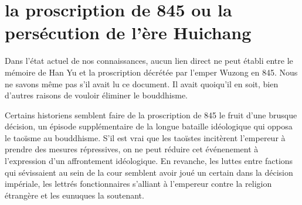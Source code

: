 \section{la proscription de 845 ou la persécution de l'ère Huichang}
\item Dans l'état actuel de nos connaissances, aucun lien direct ne peut établi entre le mémoire de Han Yu et la proscription décrétée par l'emper Wuzong en 845. Nous ne savons même pas s'il avait lu ce document. Il avait quoiqu'il en soit, bien d'autres raisons de vouloir éliminer le bouddhisme.
\item  Certains historiens semblent faire de la proscription de 845 le fruit d'une  brusque décision, un épisode supplémentaire de la longue bataille idéologique qui opposa le taoïsme au bouddhisme. S'il est vrai que les taoïstes incitèrent l'empereur à prendre des mesures répressives, on ne peut réduire cet événenement à l'expression d'un affrontement idéologique. En revanche, les luttes entre factions qui sévissaient au sein de la cour semblent avoir joué un certain dans la décision impériale, les lettrés fonctionnaires s'alliant à l'empereur contre la religion étrangère et les eunuques la soutenant.

